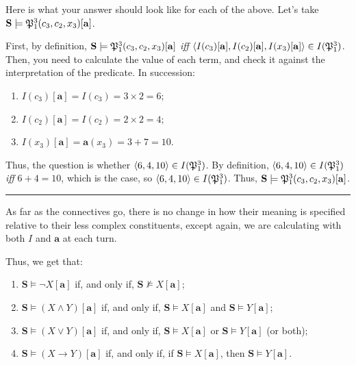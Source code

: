 \begin{remark}
Here is what your answer should look like for each of the above. Let's take $\mathbf{S} \models \mathfrak{P}^{3}_{1}(c_3, c_2, x_3)[\mathbf{a}]$. 

First, by definition,  $\mathbf{S} \models \mathfrak{P}^{3}_{1}(c_3, c_2, x_3)[\mathbf{a}]$ \textit{iff} $\langle I(c_3)[\mathbf{a}], I(c_2)[\mathbf{a}], I(x_3)[\mathbf{a}]\rangle \in I(\mathfrak{P}^{3}_{1})$. Then, you need to calculate the value of each term, and check it against the interpretation of the predicate. In succession:

\begin{enumerate}
	\item $I(c_3)[\mathbf{a}]=I(c_3)=3 \times 2=6$;
	\item $I(c_2)[\mathbf{a}]=I(c_2)=2 \times 2=4$;
	\item $I(x_3)[\mathbf{a}]=\mathbf{a}(x_3)=3 + 7=10$.
\end{enumerate}

Thus, the question is whether $\langle6, 4, 10\rangle \in I(\mathfrak{P}^{3}_{1})$. By definition, $\langle6, 4, 10\rangle \in I(\mathfrak{P}^{3}_{1})$ \textit{iff} $6+4=10$, which is the case, so $\langle6, 4, 10\rangle \in I(\mathfrak{P}^{3}_{1})$. Thus, $\mathbf{S} \models \mathfrak{P}^{3}_{1}(c_3, c_2, x_3)[\mathbf{a}]$.
\end{remark}

\hrule\medskip

As far as the connectives go, there is no change in how their meaning is specified relative to their less complex constituents, except again, we are calculating with both $I$ and $\mathbf{a}$ at each turn. 

Thus, we get that:

\begin{enumerate}
	\item $\mathbf{S} \models \neg X[\mathbf{a}]$ if, and only if, $\mathbf{S} \not\models X[\mathbf{a}]$;
	\item $\mathbf{S} \models (X \wedge Y)[\mathbf{a}]$ if, and only if, $\mathbf{S} \models X[\mathbf{a}]$ and $\mathbf{S}\models Y[\mathbf{a}]$;
	\item $\mathbf{S} \models (X \vee Y)[\mathbf{a}]$ if, and only if, $\mathbf{S} \models X[\mathbf{a}]$ or $\mathbf{S}\models Y[\mathbf{a}]$ (or both);
	\item $\mathbf{S} \models (X \rightarrow Y)[\mathbf{a}]$ if, and only if, if $\mathbf{S} \models X[\mathbf{a}]$, then $\mathbf{S} \models Y[\mathbf{a}]$. 
\end{enumerate}

